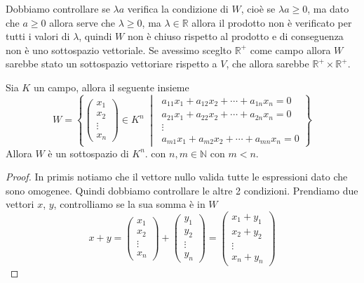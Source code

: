 \documentclass{rapport}
\begin{document}
Dobbiamo controllare se $\lambda a$ verifica la condizione di $W$, cioè se $\lambda a \geq 0 $, ma dato che $a\geq 0$ allora serve che $\lambda \geq 0$, ma $\lambda \in \mathbb{R}$ allora il prodotto non è verificato per tutti i valori di $\lambda$, quindi $W$ non è chiuso rispetto al prodotto e di conseguenza non è uno sottospazio vettoriale. Se avessimo sceglto $\mathbb{R}^+$ come campo allora $W$ sarebbe stato un sottospazio vettoriare rispetto a $V$, che allora sarebbe $\mathbb{R}^{+} \times \mathbb{R}^{+}$.

\begin{teorema}{}{}
  Sia  $K$ un campo, allora il seguente insieme 
\[
W = \left\{ \begin{pmatrix}
  x_1 \\
  x_2 \\
  \vdots \\
  x_n
\end{pmatrix} \in K^n \;\middle|\; \begin{array}{l}
  a_{11} x_1 + a_{12} x_2 + \cdots + a_{1n} x_n = 0 \\
  a_{21} x_1 + a_{22} x_2 + \cdots + a_{2n} x_n = 0 \\
  \vdots \\
  a_{m1} x_1 + a_{m2} x_2 + \cdots + a_{mn} x_n = 0
\end{array} \right\}
\]
Allora $W$ è un sottospazio di $K^n$. con $n,m\in\mathbb{N}$ con $m < n$.
\end{teorema}
\begin{proof}
  In primis notiamo che il vettore nullo valida tutte le espressioni dato che sono omogenee. Quindi dobbiamo controllare le altre 2 condizioni. Prendiamo due vettori $x$, $y$, controlliamo se la sua somma è in $W$
  \[
  x + y = \begin{pmatrix}
  x_1 \\
  x_2 \\
  \vdots \\
  x_n
\end{pmatrix} + \begin{pmatrix}
  y_1 \\
  y_2 \\
  \vdots \\
  y_n
\end{pmatrix} = \begin{pmatrix}
  x_1 +y_1 \\
  x_2 +y_2\\
  \vdots \\
  x_n + y_n
\end{pmatrix}
  \] 
\end{proof}
\end{document}
